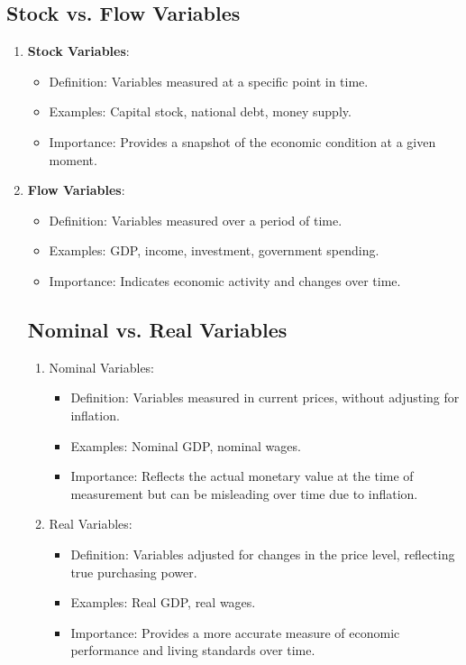 \documentclass[10pt]{article}
\begin{document}
\begin{enumerate}
\subsection*{Stock vs. Flow Variables}

\begin{enumerate}
  \item \textbf{Stock Variables}:
    \begin{itemize}
      \item Definition: Variables measured at a specific point in time.
      \item Examples: Capital stock, national debt, money supply.
      \item Importance: Provides a snapshot of the economic condition at a given moment.
    \end{itemize}

  \item \textbf{Flow Variables}:
    \begin{itemize}
      \item Definition: Variables measured over a period of time.
      \item Examples: GDP, income, investment, government spending.
      \item Importance: Indicates economic activity and changes over time.
    \end{itemize}

\subsection*{Nominal vs. Real Variables}

\begin{enumerate}
  \item Nominal Variables:

    \begin{itemize}
      \item Definition: Variables measured in current prices, without adjusting for inflation.
      \item Examples: Nominal GDP, nominal wages.
      \item Importance: Reflects the actual monetary value at the time of measurement but can be misleading over time due to inflation.
    \end{itemize}

  \item Real Variables:

    \begin{itemize}
      \item Definition: Variables adjusted for changes in the price level, reflecting true purchasing power.
      \item Examples: Real GDP, real wages.
      \item Importance: Provides a more accurate measure of economic performance and living standards over time.
\end{itemize}


\end{enumerate}
\end{enumerate}
\end{enumerate}
\end{document}
